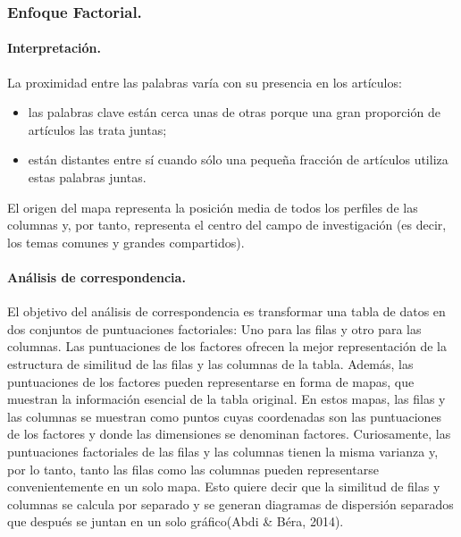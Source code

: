 \documentclass[
]{article}
\begin{document}
\hypertarget{enfoque-factorial.}{%
\subsubsection{Enfoque Factorial.}\label{enfoque-factorial.}}

\hypertarget{interpretaciuxf3n.}{%
\paragraph{Interpretación.}\label{interpretaciuxf3n.}}

La proximidad entre las palabras varía con su presencia en los
artículos:

\begin{itemize}
\item
  las palabras clave están cerca unas de otras porque una gran
  proporción de artículos las trata juntas;
\item
  están distantes entre sí cuando sólo una pequeña fracción de artículos
  utiliza estas palabras juntas.
\end{itemize}

El origen del mapa representa la posición media de todos los perfiles de
las columnas y, por tanto, representa el centro del campo de
investigación (es decir, los temas comunes y grandes compartidos).

\hypertarget{anuxe1lisis-de-correspondencia.}{%
\paragraph{Análisis de
correspondencia.}\label{anuxe1lisis-de-correspondencia.}}

El objetivo del análisis de correspondencia es transformar una tabla de
datos en dos conjuntos de puntuaciones factoriales: Uno para las filas y
otro para las columnas. Las puntuaciones de los factores ofrecen la
mejor representación de la estructura de similitud de las filas y las
columnas de la tabla. Además, las puntuaciones de los factores pueden
representarse en forma de mapas, que muestran la información esencial de
la tabla original. En estos mapas, las filas y las columnas se muestran
como puntos cuyas coordenadas son las puntuaciones de los factores y
donde las dimensiones se denominan factores. Curiosamente, las
puntuaciones factoriales de las filas y las columnas tienen la misma
varianza y, por lo tanto, tanto las filas como las columnas pueden
representarse convenientemente en un solo mapa. Esto quiere decir que la
similitud de filas y columnas se calcula por separado y se generan
diagramas de dispersión separados que después se juntan en un solo
gráfico(Abdi \& Béra, 2014).
\end{document}
